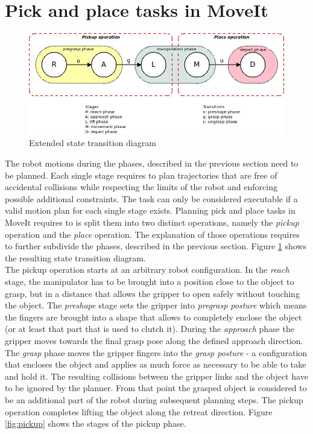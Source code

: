 \section{Pick and place tasks in MoveIt}

\begin{figure}[ht]
	\centering
  	\includegraphics[width=1.0\textwidth]{images/pick_place_states.jpg}
	\caption{Extended state transition diagram}
	\label{fig:pick_place_states}
\end{figure}

The robot motions during the phases, described in the previous section need to be planned. Each single stage requires to plan trajectories that are free of accidental collisions while respecting the limits of the robot and enforcing possible additional constraints. The task can only be considered executable if a valid motion plan for each single stage exists. Planning pick and place tasks in MoveIt requires to is split them into two distinct operations, namely the \emph{pickup} operation and the \emph{place} operation. The explanation of those operations requires to further subdivide the phases, described in the previous section. Figure \ref{fig:pick_place_states} shows the resulting state transition diagram.\\

The pickup operation starts at an arbitrary robot configuration. In the \emph{reach} stage, the manipulator has to be brought into a position close to the object to grasp, but in a distance that allows the gripper to open safely without touching the object. The \emph{preshape} stage sets the gripper into \emph{pregrasp posture} which means the fingers are brought into a shape that allows to completely enclose the object (or at least that part that is used to clutch it). During the \emph{approach} phase the gripper moves towards the final grasp pose along the defined approach direction. The \emph{grasp} phase moves the gripper fingers into the \emph{grasp posture} - a configuration that encloses the object and applies as much force as necessary to be able to take and hold it. The resulting collisions between the gripper links and the object have to be ignored by the planner. From that point the grasped object is considered to be an additional part of the robot during subsequent planning steps. The pickup operation completes lifting the object along the retreat direction. Figure \ref{fig:pickup} shows the stages of the pickup phase.

